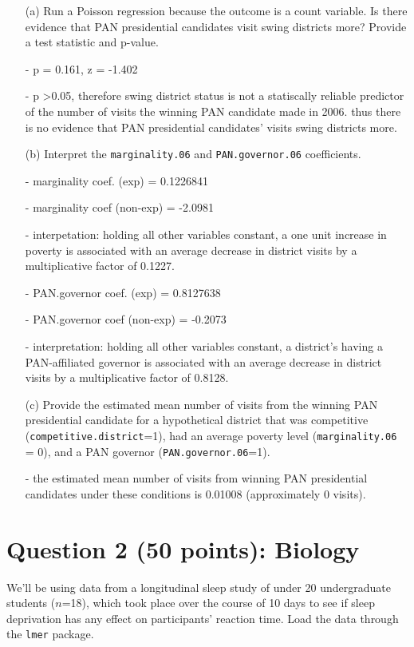 \documentclass[12pt,letterpaper]{article}
\begin{document}
\begin{enumerate}
	\item [(a)]
	Run a Poisson regression because the outcome is a count variable. Is there evidence that PAN presidential candidates visit swing districts more? Provide a test statistic and p-value.
	
	\item[-] p = 0.161, z = -1.402
	\item[-] p \textgreater 0.05, therefore swing district status is not a statiscally reliable predictor of the number of visits the winning PAN candidate made in 2006. thus there is no evidence that PAN presidential candidates' visits swing districts more.
	\item [(b)]
	Interpret the \texttt{marginality.06} and \texttt{PAN.governor.06} coefficients.
	
	\item[-] marginality coef. (exp) = 0.1226841
	\item[-] marginality coef (non-exp) = -2.0981
	\item[-] interpetation: holding all other variables constant, a one unit increase in poverty is associated with an average decrease in district visits by a multiplicative factor of 0.1227.
	\item[-] PAN.governor coef. (exp) = 0.8127638
	\item[-] PAN.governor coef (non-exp) = -0.2073
	\item[-] interpretation: holding all other variables constant, a district's having a PAN-affiliated governor is associated with an average decrease in district visits by a multiplicative factor of 0.8128.
	
	\item [(c)]
	Provide the estimated mean number of visits from the winning PAN presidential candidate for a hypothetical district that was competitive (\texttt{competitive.district}=1), had an average poverty level (\texttt{marginality.06} = 0), and a PAN governor (\texttt{PAN.governor.06}=1).
	
	\item[-] the estimated mean number of visits from winning PAN presidential candidates under these conditions is 0.01008 (approximately 0 visits).
	
\end{enumerate}
	

\section*{Question 2 (50 points): Biology}
\noindent We'll be using data from a longitudinal sleep study of under 20 undergraduate students ($n$=18), which took place over the course of 10 days to see if sleep deprivation has any effect on participants' reaction time. Load the data through the \texttt{lmer} package.
\end{document}
